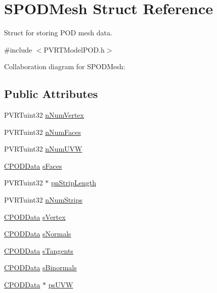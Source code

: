 \hypertarget{struct_s_p_o_d_mesh}{\section{S\+P\+O\+D\+Mesh Struct Reference}
\label{struct_s_p_o_d_mesh}
}


Struct for storing P\+O\+D mesh data.  




{\ttfamily \#include $<$P\+V\+R\+T\+Model\+P\+O\+D.\+h$>$}



Collaboration diagram for S\+P\+O\+D\+Mesh\+:
\subsection*{Public Attributes}
\begin{DoxyCompactItemize}
\item 
P\+V\+R\+Tuint32 \hyperlink{struct_s_p_o_d_mesh_a4e4b29465b82a7fcbba6c7bb2c585778}{n\+Num\+Vertex}
\item 
P\+V\+R\+Tuint32 \hyperlink{struct_s_p_o_d_mesh_aeb1fee79d92adcbc739312d44ea7caa6}{n\+Num\+Faces}
\item 
P\+V\+R\+Tuint32 \hyperlink{struct_s_p_o_d_mesh_a332be519b8d43b651c1baffb975c4046}{n\+Num\+U\+V\+W}
\item 
\hyperlink{class_c_p_o_d_data}{C\+P\+O\+D\+Data} \hyperlink{struct_s_p_o_d_mesh_a912c3225b227efaef8f86fd2d9448eb6}{s\+Faces}
\item 
P\+V\+R\+Tuint32 $\ast$ \hyperlink{struct_s_p_o_d_mesh_abde986b8c84b9e7b7f3f3c28b78e8274}{pn\+Strip\+Length}
\item 
P\+V\+R\+Tuint32 \hyperlink{struct_s_p_o_d_mesh_ac49f09d495e3a1b0152ed4eb6f15b443}{n\+Num\+Strips}
\item 
\hyperlink{class_c_p_o_d_data}{C\+P\+O\+D\+Data} \hyperlink{struct_s_p_o_d_mesh_a5dcbfddeae128f6d937e5b82418f8438}{s\+Vertex}
\item 
\hyperlink{class_c_p_o_d_data}{C\+P\+O\+D\+Data} \hyperlink{struct_s_p_o_d_mesh_a7bc4712a8f7eff22a95db2fb72e24be4}{s\+Normals}
\item 
\hyperlink{class_c_p_o_d_data}{C\+P\+O\+D\+Data} \hyperlink{struct_s_p_o_d_mesh_a411c2e02de81e618150d8004a77750c6}{s\+Tangents}
\item 
\hyperlink{class_c_p_o_d_data}{C\+P\+O\+D\+Data} \hyperlink{struct_s_p_o_d_mesh_aeb1d6c362821382a0147f2b7178853f2}{s\+Binormals}
\item 
\hyperlink{class_c_p_o_d_data}{C\+P\+O\+D\+Data} $\ast$ \hyperlink{struct_s_p_o_d_mesh_aa19d85b4e581db09dc78322d06af2280}{ps\+U\+V\+W}

\end{DoxyCompactItemize}
